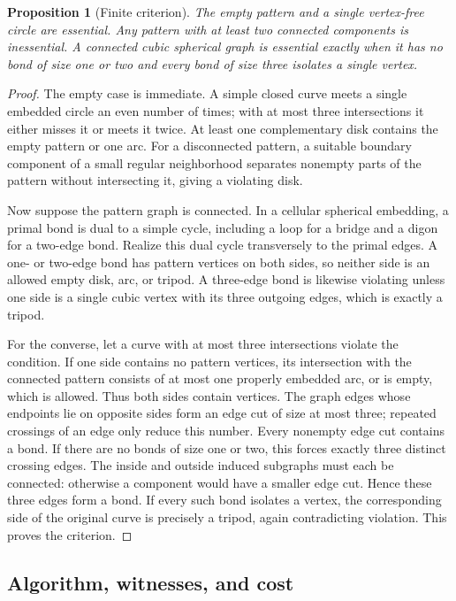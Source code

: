 \documentclass[11pt]{article}
\newtheorem{proposition}[theorem]{Proposition}
\theoremstyle{definition}
\begin{document}
\begin{proposition}[Finite criterion]
The empty pattern and a single vertex-free circle are essential. Any pattern
with at least two connected components is inessential. A connected cubic
spherical graph is essential exactly when it has no bond of size one or two
and every bond of size three isolates a single vertex.
\end{proposition}
\begin{proof}
The empty case is immediate. A simple closed curve meets a single embedded
circle an even number of times; with at most three intersections it either
misses it or meets it twice. At least one complementary disk contains the
empty pattern or one arc. For a disconnected pattern, a suitable boundary
component of a small regular neighborhood separates nonempty parts of the
pattern without intersecting it, giving a violating disk.

Now suppose the pattern graph is connected. In a cellular spherical embedding,
a primal bond is dual to a simple cycle, including a loop for a bridge and a
digon for a two-edge bond. Realize this dual cycle transversely to the primal
edges. A one- or two-edge bond has pattern vertices on both sides, so neither
side is an allowed empty disk, arc, or tripod. A three-edge bond is likewise
violating unless one side is a single cubic vertex with its three outgoing
edges, which is exactly a tripod.

For the converse, let a curve with at most three intersections violate the
condition. If one side contains no pattern vertices, its intersection with
the connected pattern consists of at most one properly embedded arc, or is
empty, which is allowed. Thus both sides contain vertices. The graph edges
whose endpoints lie on opposite sides form an edge cut of size at most three;
repeated crossings of an edge only reduce this number. Every nonempty edge
cut contains a bond. If there are no bonds of size one or two, this forces
exactly three distinct crossing edges. The inside and outside induced
subgraphs must each be connected: otherwise a component would have a smaller
edge cut. Hence these three edges form a bond. If every such bond isolates a
vertex, the corresponding side of the original curve is precisely a tripod,
again contradicting violation. This proves the criterion.
\end{proof}

\subsection{Algorithm, witnesses, and cost}
\end{document}
